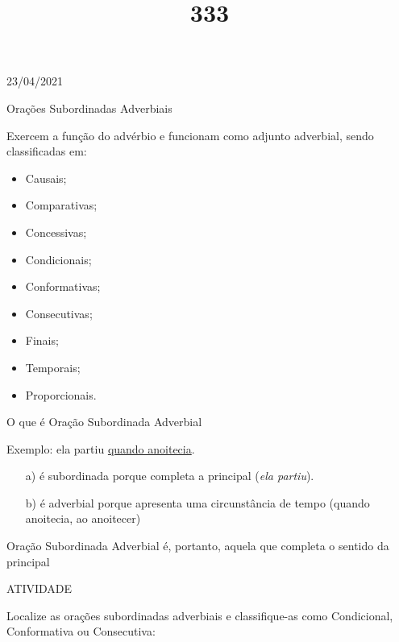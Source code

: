 \documentclass{SchoolBook}
\begin{document}
    \begin{day}{23/04/2021}
        \title{3}{Orações Subordinadas Adverbiais}
        
        Exercem a função do advérbio e funcionam como adjunto adverbial, sendo classificadas em:

        \begin{multicols}{3}
            \begin{itemize}[nosep]
                \item Causais;
                \item Comparativas;
                \item Concessivas;
                \item Condicionais;
                \item Conformativas;
                \item Consecutivas;
                \item Finais;
                \item Temporais;
                \item Proporcionais.
            \end{itemize}
        \end{multicols}

        \title{3}{O que é Oração Subordinada Adverbial}

        Exemplo: ela partiu \underline{quando anoitecia}.
        \vspace{3pt}

        \begin{enumerate}[nosep]
            \item[a)] é subordinada porque completa a principal (\emph{ela partiu}).
            \item[b)] é adverbial porque apresenta uma circunstância de tempo (quando anoitecia, ao anoitecer)
        \end{enumerate}

        \vspace{8pt}
        Oração Subordinada Adverbial é, portanto, aquela que completa o sentido da principal

        \title{3}{ATIVIDADE}

        Localize as orações subordinadas adverbiais e classifique-as como Condicional, Conformativa ou Consecutiva:
        \vspace{3pt}


\end{day}
\end{document}
